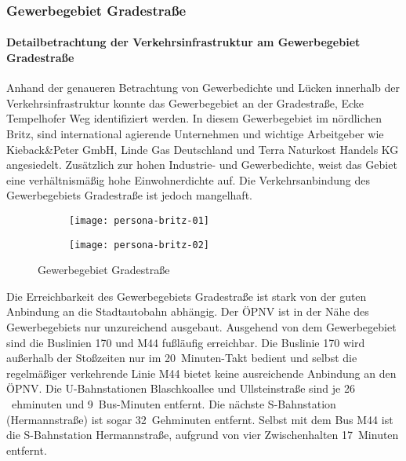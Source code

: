 \subsubsection{Gewerbegebiet Gradestraße}
\paragraph{Detailbetrachtung der Verkehrsinfrastruktur am Gewerbegebiet Gradestraße}
Anhand der genaueren Betrachtung von Gewerbedichte und Lücken innerhalb der Verkehrsinfrastruktur konnte das Gewerbegebiet an der Gradestraße, Ecke Tempelhofer Weg identifiziert werden. In diesem Gewerbegebiet im nördlichen Britz, sind international agierende Unternehmen und wichtige Arbeitgeber wie Kieback\&Peter GmbH, Linde Gas Deutschland und Terra Naturkost Handels KG angesiedelt. Zusätzlich zur hohen Industrie- und Gewerbedichte, weist das Gebiet eine verhältnismäßig hohe Einwohnerdichte auf. Die Verkehrsanbindung des Gewerbegebiets Gradestraße ist jedoch mangelhaft.

\begin{figure}
    \centering
    \begin{subfigure}{.5\textwidth}
        \centering
        \texttt{[image: persona-britz-01]}
    \end{subfigure}%
    \begin{subfigure}{.5\textwidth}
        \centering
        \texttt{[image: persona-britz-02]}
    \end{subfigure}
    \caption{Gewerbegebiet Gradestraße}
    \label{persona-britz}
\end{figure}

Die Erreichbarkeit des Gewerbegebiets Gradestraße ist stark von der guten Anbindung an die Stadtautobahn abhängig. Der ÖPNV ist in der Nähe des Gewerbegebiets nur unzureichend ausgebaut. Ausgehend von dem Gewerbegebiet sind die Buslinien 170 und M44 fußläufig erreichbar. Die Buslinie 170 wird außerhalb der Stoßzeiten nur im 20~Minuten-Takt bedient und selbst die regelmäßiger verkehrende Linie M44 bietet keine ausreichende Anbindung an den ÖPNV. Die U-Bahnstationen Blaschkoallee und Ullsteinstraße sind je 26 ~ehminuten und 9~Bus-Minuten entfernt. Die nächste S-Bahnstation (Hermannstraße) ist sogar 32~Gehminuten entfernt. Selbst mit dem Bus M44 ist die S-Bahnstation Hermannstraße, aufgrund von vier Zwischenhalten 17~Minuten entfernt.

